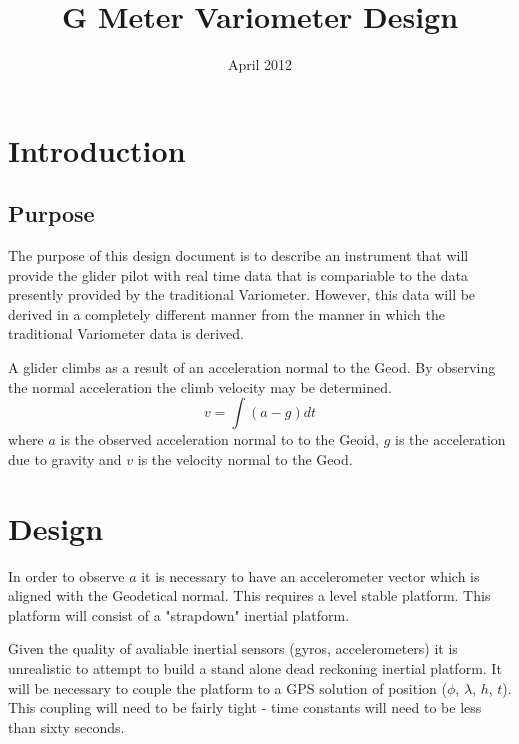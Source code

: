 \documentclass[a4paper]{report}
\title{G Meter Variometer Design}
\numberwithin{equation}{chapter}
\begin{document}
\maketitle
\date{April 2012}

\clearpage\setcounter{page}{1}
\thispagestyle{Contents}

\tableofcontents

\clearpage\setcounter{page}{1}
\thispagestyle{Contents}

\listoffigures


\clearpage\setcounter{page}{1}
\chapter[Introduction]{Introduction}

\section[Purpose]{Purpose}

The purpose of this design document is to describe an instrument that will provide the glider pilot with real time data that is compariable to the data presently provided by the traditional Variometer. However, this data will be derived in a completely different manner from the manner in which the traditional Variometer data is derived.

\bigskip

A glider climbs as a result of an acceleration normal to the Geod. By observing the normal acceleration the climb velocity may be determined.
\begin{equation}
v = \int{\left( a - g \right)} dt
\end{equation}
where $a$ is the observed acceleration normal to to the Geoid, $g$ is the acceleration due to gravity and $v$ is the velocity normal to the Geod.

\clearpage\setcounter{page}{1}
\chapter[Design]{Design}

In order to observe $a$ it is necessary to have an accelerometer vector which is aligned with the Geodetical normal. This requires a level stable platform. This platform will consist of a "strapdown" inertial platform.

\bigskip

Given the quality of avaliable inertial sensors (gyros, accelerometers) it is unrealistic to attempt to build a stand alone dead reckoning inertial platform. It will be necessary to couple the platform to a GPS solution of position ($\phi$, $\lambda$, $h$, $t$). This coupling will need to be fairly tight - time constants will need to be less than sixty seconds.
\end{document}
